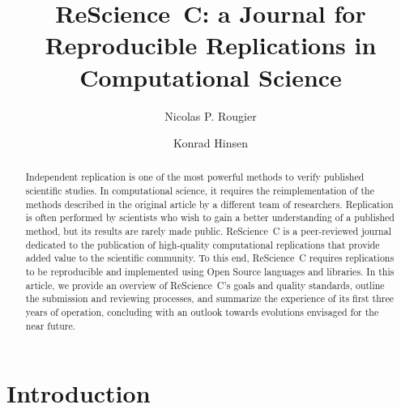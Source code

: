 \documentclass[runningheads]{llncs}
\begin{document}
%
\title{ReScience~C: a Journal for Reproducible Replications in Computational Science}
%

\author{Nicolas P. Rougier \\ \and
Konrad Hinsen}
%
%
%
\maketitle              %
%
\begin{abstract}
  Independent replication is one of the most powerful methods to
  verify published scientific studies.  In computational science, it
  requires the reimplementation of the methods described in the
  original article by a different team of researchers.  Replication is
  often performed by scientists who wish to gain a better
  understanding of a published method, but its results are rarely made
  public. ReScience~C is a peer-reviewed journal dedicated to the
  publication of high-quality computational replications that provide
  added value to the scientific community.  To this end, ReScience~C
  requires replications to be reproducible and implemented using Open
  Source languages and libraries. In this article, we provide an
  overview of ReScience~C's goals and quality standards, outline the
  submission and reviewing processes, and summarize the experience of
  its first three years of operation, concluding with an outlook
  towards evolutions envisaged for the near future.

\end{abstract}
%
\section{Introduction}
\end{document}

